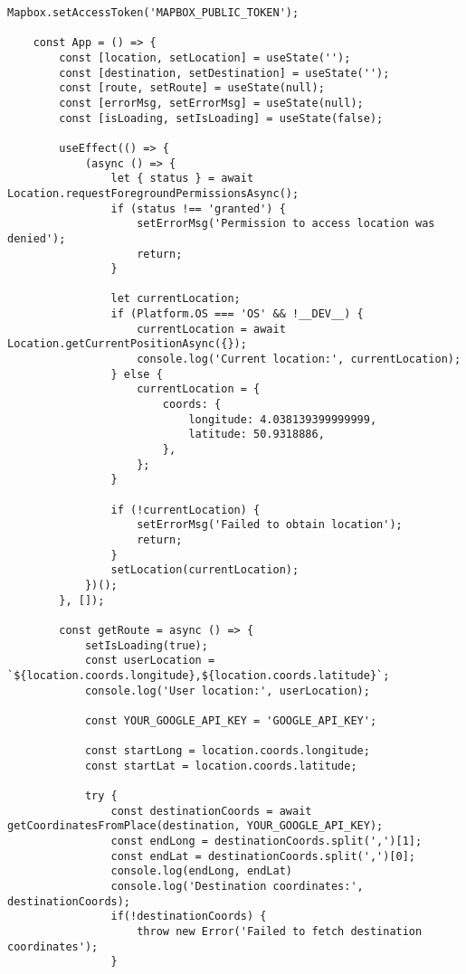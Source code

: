 \begin{lstlisting}[caption={Code-voorbeeld van het navigatiescherm}, label=code-voorbeeld navigatiescherm, captionpos=b]
    Mapbox.setAccessToken('MAPBOX_PUBLIC_TOKEN');
    
    const App = () => {
        const [location, setLocation] = useState('');
        const [destination, setDestination] = useState('');
        const [route, setRoute] = useState(null);
        const [errorMsg, setErrorMsg] = useState(null);
        const [isLoading, setIsLoading] = useState(false);
        
        useEffect(() => {
            (async () => {
                let { status } = await Location.requestForegroundPermissionsAsync();
                if (status !== 'granted') {
                    setErrorMsg('Permission to access location was denied');
                    return;
                }
                
                let currentLocation;
                if (Platform.OS === 'OS' && !__DEV__) {
                    currentLocation = await Location.getCurrentPositionAsync({});
                    console.log('Current location:', currentLocation);
                } else {
                    currentLocation = {
                        coords: {
                            longitude: 4.038139399999999,
                            latitude: 50.9318886,
                        },
                    };
                }
                
                if (!currentLocation) {
                    setErrorMsg('Failed to obtain location');
                    return;
                }
                setLocation(currentLocation);
            })();
        }, []);
        
        const getRoute = async () => {
            setIsLoading(true);
            const userLocation = `${location.coords.longitude},${location.coords.latitude}`;
            console.log('User location:', userLocation);
            
            const YOUR_GOOGLE_API_KEY = 'GOOGLE_API_KEY';
            
            const startLong = location.coords.longitude;
            const startLat = location.coords.latitude;
            
            try {
                const destinationCoords = await getCoordinatesFromPlace(destination, YOUR_GOOGLE_API_KEY);
                const endLong = destinationCoords.split(',')[1];
                const endLat = destinationCoords.split(',')[0];
                console.log(endLong, endLat)
                console.log('Destination coordinates:', destinationCoords);
                if(!destinationCoords) {
                    throw new Error('Failed to fetch destination coordinates');
                }
                

\end{lstlisting}
